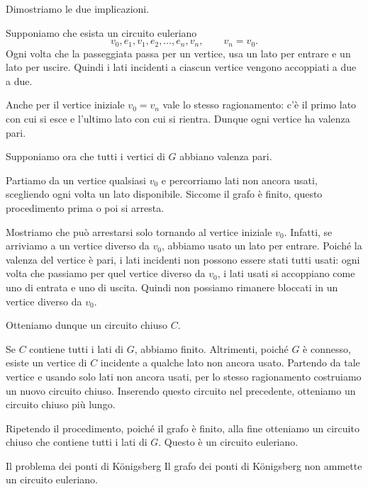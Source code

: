 \documentclass[a4paper]{article}
\begin{document}
\begin{snippetproof}{}
    Dimostriamo le due implicazioni.

    \begin{iffproof}
        \item Supponiamo che esista un circuito euleriano
        \[
            v_0,e_1,v_1,e_2,\ldots,e_n,v_n,
            \qquad
            v_n=v_0.
        \]
        Ogni volta che la passeggiata passa per un vertice, usa un lato per entrare e un lato per uscire. Quindi i lati incidenti a ciascun vertice vengono accoppiati a due a due.

        Anche per il vertice iniziale \(v_0=v_n\) vale lo stesso ragionamento: c'è il primo lato con cui si esce e l'ultimo lato con cui si rientra. Dunque ogni vertice ha valenza pari.

        \item Supponiamo ora che tutti i vertici di \(G\) abbiano valenza pari.

        Partiamo da un vertice qualsiasi \(v_0\) e percorriamo lati non ancora usati, scegliendo ogni volta un lato disponibile. Siccome il grafo è finito, questo procedimento prima o poi si arresta.

        Mostriamo che può arrestarsi solo tornando al vertice iniziale \(v_0\). Infatti, se arriviamo a un vertice diverso da \(v_0\), abbiamo usato un lato per entrare. Poiché la valenza del vertice è pari, i lati incidenti non possono essere stati tutti usati: ogni volta che passiamo per quel vertice diverso da \(v_0\), i lati usati si accoppiano come uno di entrata e uno di uscita. Quindi non possiamo rimanere bloccati in un vertice diverso da \(v_0\).

        Otteniamo dunque un circuito chiuso \(C\).

        Se \(C\) contiene tutti i lati di \(G\), abbiamo finito. Altrimenti, poiché \(G\) è connesso, esiste un vertice di \(C\) incidente a qualche lato non ancora usato. Partendo da tale vertice e usando solo lati non ancora usati, per lo stesso ragionamento costruiamo un nuovo circuito chiuso. Inserendo questo circuito nel precedente, otteniamo un circuito chiuso più lungo.

        Ripetendo il procedimento, poiché il grafo è finito, alla fine otteniamo un circuito chiuso che contiene tutti i lati di \(G\). Questo è un circuito euleriano.
    \end{iffproof}
\end{snippetproof}

\begin{snippetcorollary}{Il problema dei ponti di Königsberg}
    Il grafo dei ponti di Königsberg non ammette un circuito euleriano.
\end{snippetcorollary}
\end{document}
